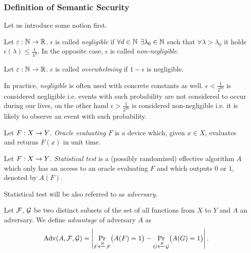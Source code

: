 \subsubsection{Definition of Semantic Security}

Let us introduce some notion first.

\begin{defn}
\label{def:neglfunc}
	Let $\varepsilon:\mathbb{N}\rightarrow\mathbb{R}$. $\epsilon$ is called {\em negligible} if $\forall d\in\mathbb{N}$ $\exists \lambda_0\in\mathbb{N}$ such that $\forall \lambda>\lambda_0$ it holds $\epsilon(\lambda)\leq\frac{1}{\lambda^d}$. In the opposite case, $\epsilon$ is called {\em non-negligible}.
\end{defn}

\begin{defn}
\label{def:overwh}
	Let $\varepsilon:\mathbb{N}\rightarrow\mathbb{R}$. $\epsilon$ is called {\em overwhelming} if $1-\epsilon$ is negligible.
\end{defn}

\begin{note}
\label{note:neglconst}
	In practice, {\em negligible} is often used with concrete constants as well. $\epsilon<\frac{1}{2^{80}}$ is considered negligible i.e. events with such probability are not considered to occur during our lives, on the other hand $\epsilon>\frac{1}{2^{30}}$ is considered non-negligible i.e. it is likely to observe an event with such probability.
\end{note}

\begin{defn}[Oracle]
\label{def:oracle}
	Let $F:X\rightarrow Y$. {\em Oracle evaluating $F$} is a device which, given $x\in X$, evaluates and returns $F(x)$ in unit time.
\end{defn}

\begin{defn}
	Let $F:X\rightarrow Y$. {\em Statistical test} is a (possibly randomized) effective algorithm $A$ which only has an access to an oracle evaluating $F$ and which outputs $0$ or $1$, denoted by $A(F)$.
\end{defn}

\begin{note}
	Statistical test will be also referred to as {\em adversary}.
\end{note}

\begin{defn}[Advantage]
\label{def:advant}
	Let $\cal F$, $\cal G$ be two distinct subsets of the set of all functions from $X$ to $Y$ and $A$ an adversary. We define {\em advantage} of adversary $A$ as
	\[
		\operatorname*{Adv}(A,{\cal F},{\cal G}) = \left| \Pr\limits_{F\xleftarrow{R} {\cal F}}\bigl(A(F)=1\bigr) - \Pr\limits_{G\xleftarrow{R} {\cal G}}\bigl(A(G)=1\bigr) \right| .
	\]
\end{defn}

